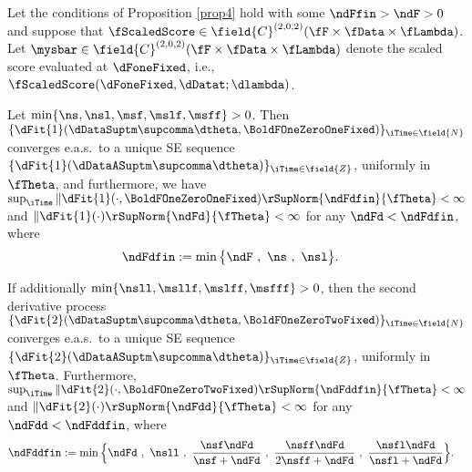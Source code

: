 \begin{prop} \label{prop4new} 
Let the conditions of Proposition \ref{prop4} hold with some $\ndFfin>\ndF>0$ and suppose that 
$\fScaledScore \in \field{C}^{(2,0,2)}(\fF \times \fData \times \fLambda )$. 
Let $\mysbar \in \field{C}^{(2,0,2)}(\fF \times \fData \times \fLambda )$ denote the scaled score evaluated at $\dFoneFixed$, i.e., $\fScaledScore(\dFoneFixed,\dDatat;\dlambda)$.

Let $\min\{\ns,\nsl,\msf,\mslf,\msff\}>0$. Then $\{\dFit{1}(\dDataSuptm\supcomma\dtheta,\BoldFOneZeroOneFixed)\}_{\iTime \in \field{N}}$ 
converges e.a.s.~to a unique SE sequence
$\{\dFit{1}(\dDataASuptm\supcomma\dtheta)\}_{\iTime \in \field{Z}}$, uniformly in $\fTheta$, and furthermore, we have $\sup_{\iTime} \|  \dFit{1}(\cdot,\BoldFOneZeroOneFixed) \rSupNorm{\ndFdfin }{\fTheta} < \infty$
and  
$\|\dFit{1}(\cdot)\rSupNorm{\ndFd}{\fTheta} < \infty$ for any $\ndFd<\ndFdfin$, where 
\begin{align*}
   \ndFdfin & := \min \big\{\ndF\ ,\  \ns \ , \  \nsl \big\}.
\end{align*}

If additionally $\min\{\nsll,\msllf,\mslff,\msfff\}>0$, then the second 
derivative process $\{\dFit{2}(\dDataSuptm\supcomma\dtheta,\BoldFOneZeroTwoFixed)\}_{\iTime \in \field{N}}$ 
converges e.a.s.~to a unique SE sequence
$\{\dFit{2}(\dDataASuptm\supcomma\dtheta)\}_{\iTime \in \field{Z}}$, uniformly in $\fTheta$. Furthermore,  $\sup_{\iTime} \|  \dFit{2}(\cdot,\BoldFOneZeroTwoFixed) \rSupNorm{\ndFddfin }{\fTheta} < \infty$
and  
$\|\dFit{2}(\cdot)\rSupNorm{\ndFdd}{\fTheta} < \infty$ for any $\ndFdd<\ndFddfin$, where 
\begin{align*}
    \ndFddfin & := \min \Big\{\ndFd\ ,\  \nsll \ , \ \frac{\nsf \ndFd }{\nsf + \ndFd} \ , 
    \ \frac{\nsff \ndFd }{2 \nsff + \ndFd} \ , \ \frac{ \nsfl \ndFd }{ \nsfl + \ndFd} \Big\}.
\end{align*}
\end{prop}




